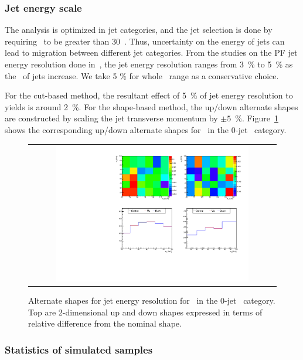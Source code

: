 \subsubsection{Jet energy scale} 

The analysis is optimized in jet categories, and the jet selection is done by 
requiring \pt\ to be greater than 30~\GeV. Thus, uncertainty on the 
energy of jets can lead to migration between different jet categories.  
From the studies on the PF jet energy resolution done in~\cite{Chatrchyan:2011ds}, 
the jet energy resolution ranges from 3~\% to 5~\% as the \Eta\ of jets increase. 
We take 5 \% for whole \Eta\ range as a conservative choice.   

For the cut-based method, the resultant effect of 5~\% of jet energy resolution 
to yields is around 2~\%. 
For the shape-based method, the up/down alternate shapes are constructed
by scaling the jet transverse momentum by $\pm 5$~\%.
Figure~\ref{fig:alter_jes} shows the corresponding up/down alternate shapes
for \qqww\ in the 0-jet \DF\ category. 

%
\begin{figure}[htp]
\centering
\begin{tabular}{c}
\includegraphics[width=0.8\textwidth]{figures/histo_qqWW_CMS_hww_MVAJESBounding_0j_zoom.pdf}
\end{tabular}
\caption{Alternate shapes for jet energy resolution for \qqww\ in the 0-jet \DF\ category.
         Top are 2-dimensional up and down shapes expressed in terms of relative 
         difference from the nominal shape.}
\label{fig:alter_jes}
\end{figure}

\subsubsection{Statistics of simulated samples} 

